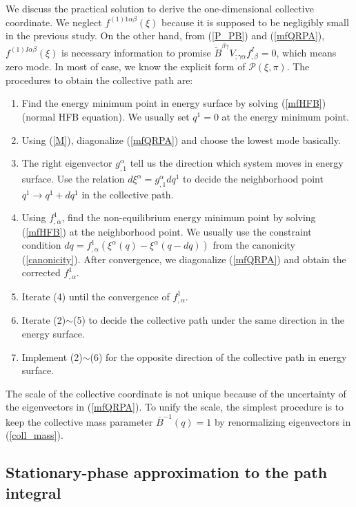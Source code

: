 \documentclass[%
superscriptaddress,
showpacs,
nofootinbib,
amsmath,amssymb,
aps,
prc,
twocolumn,
floatfix ]%
{revtex4-1}
\begin{document}
We discuss the practical solution to derive the one-dimensional collective coordinate. We neglect $f^{(1)1\alpha\beta}(\xi)$ because it is supposed to be negligibly small in the previous study. On the other hand, from (\ref{P_PB}) and (\ref{mfQRPA}), $f^{(1)I\alpha\beta}(\xi)$ is necessary information to promise $\tilde{B}^{\beta\gamma}V_{;\gamma\alpha}f^I_{,\beta}=0$, which means zero mode. In most of case, we know the explicit form of $\mathcal{P}(\xi,\pi)$. The procedures to obtain the collective path are: 
\begin{enumerate}
\item Find the energy minimum point in energy surface by solving (\ref{mfHFB}) (normal HFB equation). We usually set $q^1=0$ at the energy minimum point.
\item Using (\ref{M}), diagonalize (\ref{mfQRPA}) and choose the lowest mode basically.%
\item The right eigenvector $g^{\alpha}_{,1}$ tell us the direction which system moves in energy surface. Use the relation $d\xi^{\alpha}=g^{\alpha}_{,1}dq^1$ to decide the neighborhood point $q^1\to q^1+dq^1$ in the collective path. 
\item Using $f^1_{,\alpha}$, find the non-equilibrium energy minimum point by solving (\ref{mfHFB}) at the neighborhood point. We usually use the constraint condition $dq=f^1_{,\alpha}(\xi^{\alpha}(q)-\xi^{\alpha}(q-dq))$ from the canonicity (\ref{canonicity}). After convergence, we diagonalize (\ref{mfQRPA}) and obtain the corrected $f^1_{,\alpha}$.
\item Iterate (4) until the convergence of $f^1_{,\alpha}$.  
\item Iterate (2)$\sim$(5) to decide the collective path under the same direction in the energy surface. 
\item Implement (2)$\sim$(6) for the opposite direction of the collective path in energy surface. 
\end{enumerate}
The scale of the collective coordinate is not unique because of the uncertainty of the eigenvectors in (\ref{mfQRPA}). To unify the scale, the simplest procedure is to keep the collective mass parameter $\bar{B}^{-1}(q)=1$ by renormalizing eigenvectors in (\ref{coll_mass}). 

\subsection{Stationary-phase approximation to the path integral}
\end{document}
